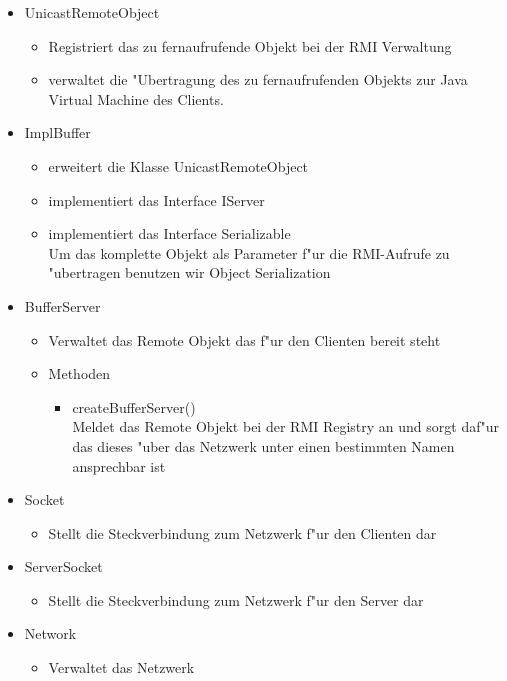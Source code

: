 \documentclass[a4paper,10pt]{article}
\begin{document}
\begin{itemize}
\item UnicastRemoteObject
\begin{itemize}
\item Registriert das zu fernaufrufende Objekt bei der RMI Verwaltung
\item verwaltet die "Ubertragung des zu fernaufrufenden Objekts zur Java Virtual Machine des Clients.
\end{itemize}
\item ImplBuffer
\begin{itemize}
\item erweitert die Klasse UnicastRemoteObject
\item implementiert das Interface IServer
\item implementiert das Interface Serializable
\\Um das komplette Objekt als Parameter f"ur die RMI-Aufrufe zu "ubertragen benutzen wir Object Serialization 
\end{itemize}
\item BufferServer
\begin{itemize}
\item Verwaltet das Remote Objekt das f"ur den Clienten bereit steht  
\end{itemize}
\begin {itemize}
\item Methoden
\begin{itemize}
\item createBufferServer()
\\Meldet das Remote Objekt bei der RMI Registry an und sorgt daf"ur das dieses "uber das Netzwerk unter einen bestimmten Namen ansprechbar ist
\end{itemize}
\end{itemize}
\item Socket
\begin{itemize}
\item Stellt die Steckverbindung zum Netzwerk f"ur den Clienten dar
\end{itemize}
\item ServerSocket
\begin{itemize}
\item Stellt die Steckverbindung zum Netzwerk f"ur den Server dar
\end{itemize}
\item Network
\begin{itemize}
\item Verwaltet das Netzwerk
\end{itemize}

\end{itemize}
\end{document}

